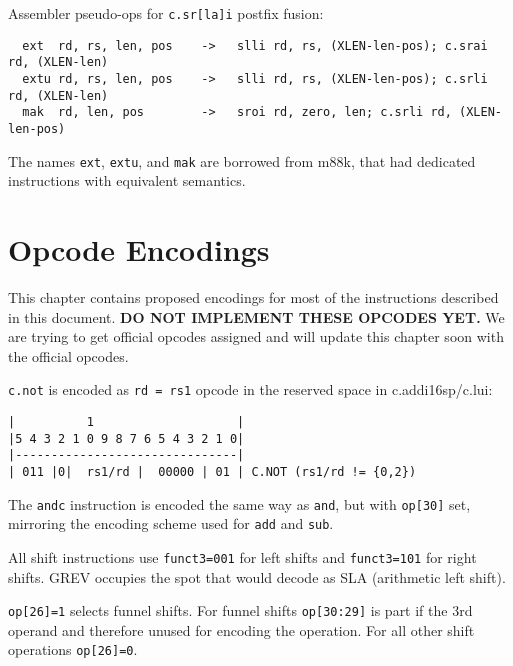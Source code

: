 Assembler pseudo-ops for {\tt c.sr[la]i} postfix fusion:

\begin{minipage}{\linewidth}
\begin{verbatim}
  ext  rd, rs, len, pos    ->   slli rd, rs, (XLEN-len-pos); c.srai rd, (XLEN-len)
  extu rd, rs, len, pos    ->   slli rd, rs, (XLEN-len-pos); c.srli rd, (XLEN-len)
  mak  rd, len, pos        ->   sroi rd, zero, len; c.srli rd, (XLEN-len-pos)
\end{verbatim}
\end{minipage}

The names {\tt ext}, {\tt extu}, and {\tt mak} are borrowed from m88k, that had
dedicated instructions with equivalent semantics.~\cite[p.~3-28]{m88k}


\section{Opcode Encodings}
\label{opcodes}

This chapter contains proposed encodings for most of the instructions described
in this document. {\bf DO NOT IMPLEMENT THESE OPCODES YET.} We are trying to get
official opcodes assigned and will update this chapter soon with the official
opcodes.

{\tt c.not} is encoded as {\tt rd = rs1} opcode in the reserved space in
c.addi16sp/c.lui:

\begin{minipage}{\linewidth}
\begin{verbatim}
|          1                    |
|5 4 3 2 1 0 9 8 7 6 5 4 3 2 1 0|
|-------------------------------|
| 011 |0|  rs1/rd |  00000 | 01 | C.NOT (rs1/rd != {0,2})
\end{verbatim}
\end{minipage}

The {\tt andc} instruction is encoded the same way as {\tt and}, but with
{\tt op[30]} set, mirroring the encoding scheme used for {\tt add} and {\tt sub}.

All shift instructions use {\tt funct3=001} for left shifts and {\tt funct3=101}
for right shifts. GREV occupies the spot that would decode as SLA (arithmetic
left shift).

{\tt op[26]=1} selects funnel shifts. For funnel shifts {\tt op[30:29]} is part
if the 3rd operand and therefore unused for encoding the operation. For all other
shift operations {\tt op[26]=0}.

